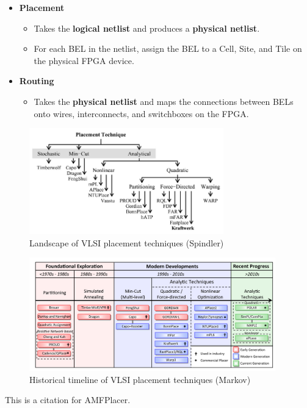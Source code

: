 \documentclass{article}
\begin{document}
\begin{itemize}[label={\textbullet}, left=0.25cm]
        \item \textbf{Placement}
        \begin{itemize}[label={--}, left=0.25cm]
            \item Takes the \textbf{logical netlist} and produces a \textbf{physical netlist}.
            \item For each BEL in the netlist, assign the BEL to a Cell, Site, and Tile on the physical FPGA device.
        \end{itemize}

        \item \textbf{Routing}
        \begin{itemize}[label={--}, left=0.25cm]
            \item Takes the \textbf{physical netlist} and maps the connections between BELs onto wires, interconnects, and switchboxes on the FPGA.
        \end{itemize}

    \end{itemize}

    \newpage
    \begin{figure}
        \begin{center}
            \includegraphics[width=0.75\textwidth]{figures/kraftwerk2.png}
        \end{center}
        \caption{Landscape of VLSI placement techniques (Spindler) \cite{kraftwerk2} }
        \label{fig:kraftwerk2}
    \end{figure}
    \begin{figure}
        \begin{center}
            \includegraphics[width=0.95\textwidth]{figures/ProCha.png}
        \end{center}
        \caption{Historical timeline of VLSI placement techniques (Markov) \cite{ProCha} }
        \label{fig:ProCha}
    \end{figure}

    This is a citation for AMFPlacer. \cite{AMFPlacer}

    \newpage
    
    \nocite{*}
    
\end{document}

